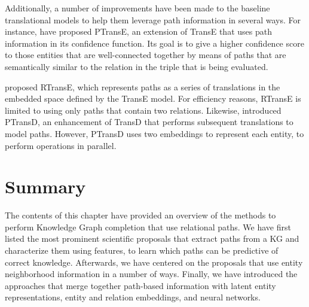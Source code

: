 Additionally, a number of improvements have been made to the baseline translational models to help them leverage path information in several ways. For instance, \citet{lin2015} have proposed PTransE, an extension of TransE that uses path information in its confidence function. Its goal is to give a higher confidence score to those entities that are well-connected together by means of paths that are semantically similar to the relation in the triple that is being evaluated.

\citet{garcia-duran2015b} proposed RTransE, which represents paths as a series of translations in the embedded space defined by the TransE model. For efficiency reasons, RTransE is limited to using only paths that contain two relations. Likewise, \citet{xiong2018b} introduced PTransD, an enhancement of TransD that performs subsequent translations to model paths. However, PTransD uses two embeddings to represent each entity, to perform operations in parallel.

\section{Summary}\label{sec:path-summary}
The contents of this chapter have provided an overview of the methods to perform Knowledge Graph completion that use relational paths. We have first listed the most prominent scientific proposals that extract paths from a KG and characterize them using features, to learn which paths can be predictive of correct knowledge. Afterwards, we have centered on the proposals that use entity neighborhood information in a number of ways. Finally, we have introduced the approaches that merge together path-based information with latent entity representations, entity and relation embeddings, and neural networks.